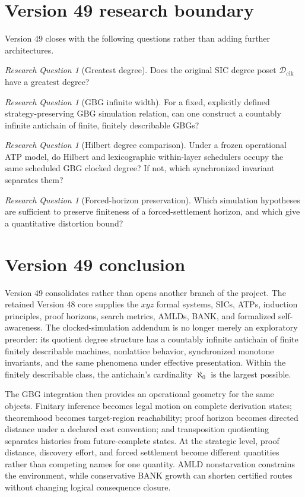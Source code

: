 \documentclass[11pt]{article}
\theoremstyle{remark}
\newtheorem{question}[definition]{Research Question}
\newcommand{\Dclk}{\mathcal D_{\mathrm{clk}}}
\begin{document}
\section{Version 49 research boundary}

Version 49 closes with the following questions rather than adding further architectures.

\begin{question}[Greatest degree]
Does the original SIC degree poset \(\Dclk\) have a greatest degree?
\end{question}

\begin{question}[GBG infinite width]
For a fixed, explicitly defined strategy-preserving GBG simulation relation, can one construct a
countably infinite antichain of finite, finitely describable GBGs?
\end{question}

\begin{question}[Hilbert degree comparison]
Under a frozen operational ATP model, do Hilbert and lexicographic within-layer schedulers occupy
the same scheduled GBG clocked degree?  If not, which synchronized invariant separates them?
\end{question}

\begin{question}[Forced-horizon preservation]
Which simulation hypotheses are sufficient to preserve finiteness of a forced-settlement horizon,
and which give a quantitative distortion bound?
\end{question}

\section{Version 49 conclusion}

Version 49 consolidates rather than opens another branch of the project.
The retained Version 48 core supplies the \(xyz\) formal systems, SICs, ATPs, induction principles,
proof horizons, search metrics, AMLDs, BANK, and formalized self-awareness.
The clocked-simulation addendum is no longer merely an exploratory preorder:
its quotient degree structure has a countably infinite antichain of finite finitely describable
machines, nonlattice behavior, synchronized monotone invariants, and the same phenomena under
effective presentation.
Within the finitely describable class, the antichain's cardinality \(\aleph_0\) is the largest possible.

The GBG integration then provides an operational geometry for the same objects.
Finitary inference becomes legal motion on complete derivation states;
theoremhood becomes target-region reachability;
proof horizon becomes directed distance under a declared cost convention;
and transposition quotienting separates histories from future-complete states.
At the strategic level, proof distance, discovery effort, and forced settlement become different
quantities rather than competing names for one quantity.
AMLD nonstarvation constrains the environment, while conservative BANK growth can shorten certified
routes without changing logical consequence closure.
\end{document}
